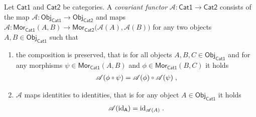 %
%
%
\begin{definition}[Functor]
	Let $\mathsf{Cat1}$ and $\mathsf{Cat2}$ be categories. A \emph{covariant functor} $\mathscr{A}: \mathsf{Cat1} \to \mathsf{Cat2}$ consists of the map $\mathscr{A} : \mathsf{Obj}_\mathsf{Cat1} \to \mathsf{Obj}_\mathsf{Cat2}$ and maps $\mathscr{A}: \mathsf{Mor}_\mathsf{Cat1}(A,B) \to \mathsf{Mor}_\mathsf{Cat2}\big(\mathscr{A}(A),\mathscr{A}(B)\big)$ for any two objects $A,B \in \mathsf{Obj}_\mathsf{Cat1}$ such that
	\begin{enumerate}
		\item {the composition is preserved, that is for all objects $A,B,C \in \mathsf{Obj}_\mathsf{Cat1}$ and for any morphisms $\psi \in \mathsf{Mor}_\mathsf{Cat1}(A,B)$ and $\phi \in \mathsf{Mor}_\mathsf{Cat1}(B,C)$ it holds
		\begin{align}
			\mathscr{A}(\phi \comp \psi) = \mathscr{A}(\phi) \comp \mathscr{A}(\psi) \formspace,
		\end{align}}
		\item{
			$\mathscr{A}$ maps identities to identities, that is for any object $A \in \mathsf{Obj}_\mathsf{Cat1}$ it holds
			\begin{align}
				\mathscr{A}(\text{id}_\mathsf{A}) = \text{id}_{\mathscr{A}(A)} \;.
			\end{align}
			}
	\end{enumerate}
\end{definition}
%
%
%
%
%
%
%
%
%
%
%
%
%
%
